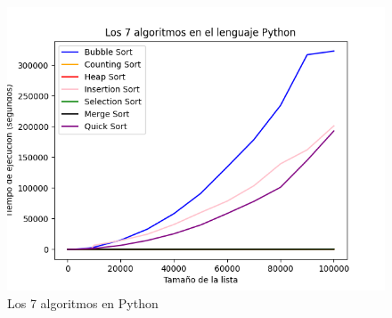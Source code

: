 \begin{figure}[h]
    \centering
    \includegraphics[scale=.60]{img/Python.png}
    \caption{Los 7 algoritmos en Python}
    \label{fig:primera_figura}
\end{figure}
